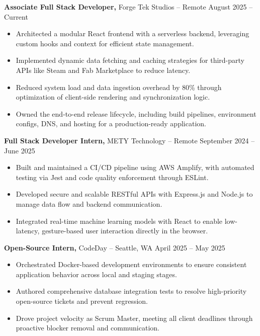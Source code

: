 \documentclass[11pt]{article}       %
\begin{document}
\textbf{Associate Full Stack Developer,} {Forge Tek Studios} -- Remote \hfill August 2025 -- Current 
\vspace{-9pt}
\begin{itemize}
  \item Architected a modular React frontend with a serverless backend, leveraging custom hooks and context for efficient state management.
  \item Implemented dynamic data fetching and caching strategies for third-party APIs like Steam and Fab Marketplace to reduce latency.
  \item Reduced system load and data ingestion overhead by 80\% through optimization of client-side rendering and synchronization logic.
  \item Owned the end-to-end release lifecycle, including build pipelines, environment configs, DNS, and hosting for a production-ready application.
\end{itemize}

\textbf{Full Stack Developer Intern,} {METY Technology} -- Remote \hfill September 2024 -- June 2025 
\vspace{-9pt}
\begin{itemize}
  \item Built and maintained a CI/CD pipeline using AWS Amplify, with automated testing via Jest and code quality enforcement through ESLint.
  \item Developed secure and scalable RESTful APIs with Express.js and Node.js to manage data flow and backend communication.
  \item Integrated real-time machine learning models with React to enable low-latency, gesture-based user interaction directly in the browser.
\end{itemize}

\textbf{Open-Source Intern,} {CodeDay} -- Seattle, WA \hfill April 2025 -- May 2025 \\
\vspace{-9pt}
\begin{itemize}
  \item Orchestrated Docker-based development environments to ensure consistent application behavior across local and staging stages.
  \item Authored comprehensive database integration tests to resolve high-priority open-source tickets and prevent regression.
  \item Drove project velocity as Scrum Master, meeting all client deadlines through proactive blocker removal and communication.
\end{itemize}
\end{document}
